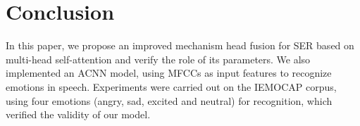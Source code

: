 \documentclass[10pt, conference, compsocconf]{IEEEtran}
\begin{document}



\section{Conclusion}
In this paper, we propose an improved mechanism head fusion for SER based on multi-head self-attention and verify the role of its parameters. We also implemented an ACNN model, using MFCCs as input features to recognize emotions in speech. Experiments were carried out on the IEMOCAP corpus, using four emotions (angry, sad, excited and neutral) for recognition, which verified the validity of our model.



%
%




%
%
%
%
%


%
%



\end{document}
